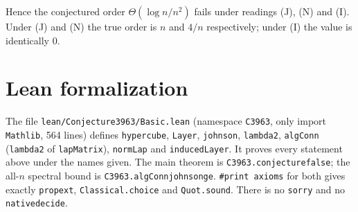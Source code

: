 \documentclass[11pt]{article}
\theoremstyle{definition}
\theoremstyle{remark}
\renewcommand{\_}{\oldus\allowbreak}
\begin{document}
Hence the conjectured order $\Theta(\log n/n^2)$ fails under readings (J), (N) and (I). Under (J) and
(N) the true order is $n$ and $4/n$ respectively; under (I) the value is identically $0$.

\section{Lean formalization}

The file \texttt{lean/Conjecture3963/Basic.lean} (namespace \texttt{C3963}, only import
\texttt{Mathlib}, 564 lines) defines \texttt{hypercube}, \texttt{Layer}, \texttt{johnson},
\texttt{lambda2}, \texttt{algConn} (\texttt{lambda2} of \texttt{lapMatrix}), \texttt{normLap} and
\texttt{inducedLayer}. It proves every statement above under the names given. The main theorem is
\texttt{C3963.conjecture\_3963\_false}; the all-$n$ spectral bound is \texttt{C3963.algConn\_johnson\_ge}.
\texttt{\#print axioms} for both gives exactly \texttt{propext}, \texttt{Classical.choice} and
\texttt{Quot.sound}. There is no \texttt{sorry} and no \texttt{native\_decide}.
\end{document}
